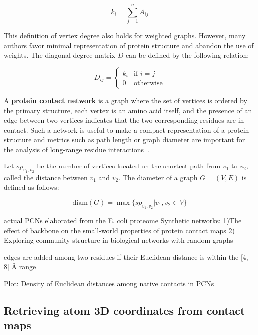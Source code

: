        \begin{equation}
            k_i = \sum\limits_{j=1}^{n} A_{ij}
        \end{equation}

        This definition of vertex degree also holds for weighted graphs. However, many authors favor minimal representation of protein structure
        and abandon the use of weights. The diagonal degree matrix $D$ can be defined by the following relation:

        \begin{equation}    
            D_{ij} =
                \begin{cases}
                    k_i & \text{if } i = j \\
                    0 & \text{otherwise}
                \end{cases}       
        \end{equation}

        A \textbf{protein contact network} is a graph where the set of vertices is ordered by the primary structure, each vertex is an amino acid itself,
        and the presence of an edge between two vertices indicates that the two corresponding residues are in contact. Such a network is useful to make a compact 
        representation of a protein structure and metrics such as path length or graph diameter are important for the analysis of long-range residue
        interactions~\cite{doi:10.1021/cr3002356}.

        Let $sp_{v_1,v_2}$ be the number of vertices located on the shortest path from $v_1$ to $v_2$, called the distance between $v_1$ and $v_2$.
        The diameter of a graph $G = (V, E)$ is defined as follows:

        \begin{equation}
            \text{diam}(G) = \max \{ sp_{v_1, v_2} | v_1, v_2 \in V \}
        \end{equation}


        \cite{doi:10.1080/07391102.2015.1077736}
        actual PCNs elaborated from the E. coli proteome 
        Synthetic networks:
        1)The effect of backbone on the small-world properties of protein contact maps
        2) Exploring community structure in biological networks with random graphs

        edges are added among two residues if their Euclidean distance is within the [4, 8] \AA{} range

        Plot: Density of Euclidean distances among native contacts in PCNs

    \subsection{Retrieving atom 3D coordinates from contact maps}

        \todo{}
